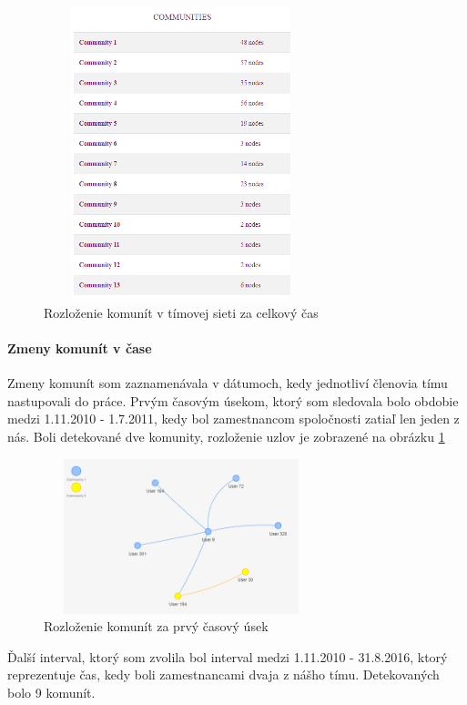 \documentclass[slovak,master,public,dept460,male,cpdeclaration,oneside]{diploma}
\begin{document}
\begin{figure}[H]
\centering
\includegraphics[width=8cm, height=8.5cm]{figures/team_communities_tab_celkovo}
\caption{Rozloženie komunít v tímovej sieti za celkový čas}
\end{figure}

\paragraph{Zmeny komunít v čase}
\hfill \break

Zmeny komunít som zaznamenávala v dátumoch, kedy jednotliví členovia tímu nastupovali do práce. Prvým časovým úsekom, ktorý som sledovala bolo obdobie medzi 1.11.2010 - 1.7.2011, kedy bol zamestnancom spoločnosti zatiaľ len jeden z nás. Boli detekované dve komunity, rozloženie uzlov je zobrazené na obrázku \ref{team_communities_first}

\begin{figure}[H]
\centering
\includegraphics[width=8cm, height=4.5cm]{figures/team_communities_tab_first}
\caption{Rozloženie komunít za prvý časový úsek}
\label{team_communities_first}
\end{figure}


Ďalší interval, ktorý som zvolila bol interval medzi 1.11.2010 - 31.8.2016, ktorý reprezentuje čas, kedy boli zamestnancami dvaja z nášho tímu. Detekovaných bolo 9 komunít. 
\end{document}
